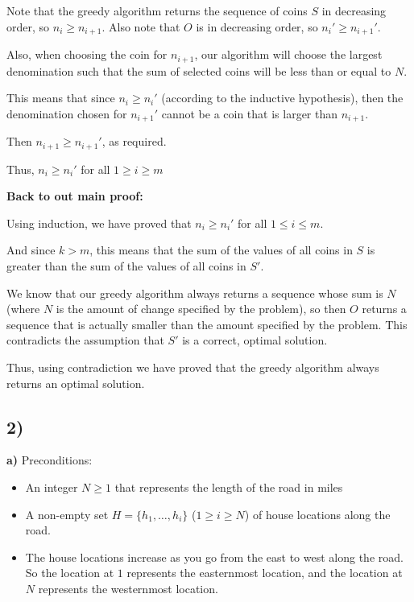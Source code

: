 \documentclass{article}
\begin{document}
Note that the greedy algorithm returns the sequence of coins $S$ in decreasing order, so $n_i \geq n_{i+1}$.
Also note that $O$ is in decreasing order, so $n_i' \geq n_{i+1}'$.

Also, when choosing the coin for $n_{i+1}$, our algorithm will choose the largest denomination such that the sum of selected coins will be less than or equal to $N$. 

This means that since $n_i \geq n_i'$ (according to the inductive hypothesis), then the denomination chosen for $n_{i+1}'$ cannot be a coin that is larger than $n_{i+1}$.

Then $n_{i+1} \geq n_{i+1}'$, as required.

Thus, $n_i \geq n_i'$ for all $1 \geq i \geq m$


\textbf{Back to out main proof:}

Using induction, we have proved that $n_i \geq n_i'$ for all $1 \leq i \leq m$. 

And since $k > m$, this means that the sum of the values of all coins in $S$ is greater than the sum of the values of all coins in $S'$. 

We know that our greedy algorithm always returns a sequence whose sum is $N$ (where $N$ is the amount of change specified by the problem), so then $O$ returns a sequence that is actually smaller than the amount specified by the problem. This contradicts the assumption that $S'$ is a correct, optimal solution.

Thus, using contradiction we have proved that the greedy algorithm always returns an optimal solution.


\subsection*{2)}

\textbf{a)}
Preconditions:
\begin{itemize}
    \item An integer $N \geq 1$ that represents the length of the road in miles
    \item A non-empty set $H = \{h_1, \dotsc, h_i\}$ ($1 \geq i \geq N$) of house locations along the road.
    \item The house locations increase as you go from the east to west along the road. So the location at $1$ represents the easternmost location, and the location at $N$ represents the westernmost location.
\end{itemize}
\end{document}
